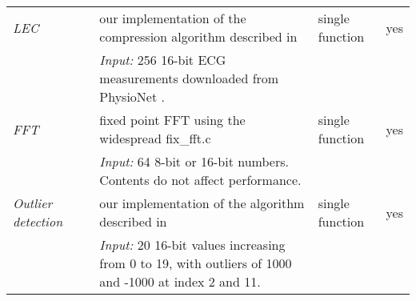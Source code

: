 \begin{table}[h]
\begin{tabular}{llp{}ll}
\emph{LEC}               &                                          & our implementation of the compression algorithm described in \cite{Marcelloni:2009ja}                      & single function  & yes \\
                         &                                          & \emph{Input:} 256 16-bit ECG measurements downloaded from PhysioNet \cite{physionet-ecg-data}.             &                  & \\

\emph{FFT}               & \cite{Kumar:2007ge}                      & fixed point FFT using the widespread fix\_fft.c \cite{sos-operating-system}                                & single function  & yes \\
                         &                                          & \emph{Input:} 64 8-bit or 16-bit numbers. Contents do not affect performance.                              &                  & \\

\emph{Outlier detection} & \cite{Kumar:2007ge}                      & our implementation of the algorithm described in \cite{Kumar:2007ge}                                       & single function  & yes \\
                         &                                          & \emph{Input:} 20 16-bit values increasing from 0 to 19, with outliers of 1000 and -1000 at index 2 and 11. &                  & \\

\bottomrule
\end{tabular}  
\end{table}
